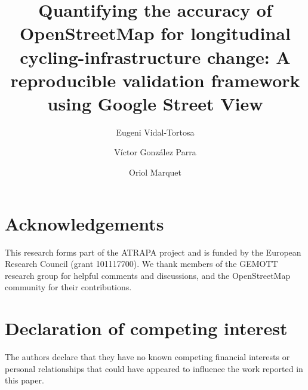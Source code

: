 \documentclass[
]{article}
\title{Quantifying the accuracy of OpenStreetMap for longitudinal
cycling-infrastructure change: A reproducible validation framework using
Google Street View}
\author{Eugeni Vidal-Tortosa \and Víctor González Parra \and Oriol
Marquet}
\date{}
\begin{document}
\maketitle


\section*{Acknowledgements}\label{acknowledgements}

This research forms part of the ATRAPA project and is funded by the
European Research Council (grant 101117700). We thank members of the
GEMOTT research group for helpful comments and discussions, and the
OpenStreetMap community for their contributions.

\section*{Declaration of competing
interest}\label{declaration-of-competing-interest}

The authors declare that they have no known competing financial
interests or personal relationships that could have appeared to
influence the work reported in this paper.
\end{document}
